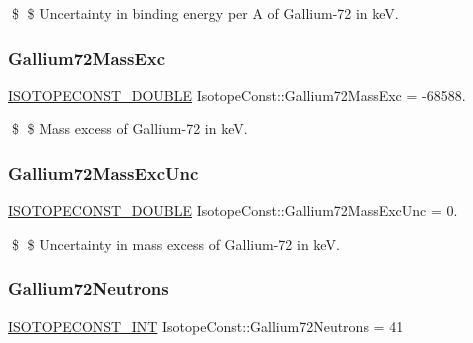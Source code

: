 \$ \$ Uncertainty in binding energy per A of Gallium-\/72 in keV. \mbox{\label{group___isotope_const-_gallium-_ga72_gac3fbf693140e57610e1c8f3db0bf1c1f}} 
\subsubsection{\texorpdfstring{Gallium72\+Mass\+Exc}{Gallium72MassExc}}
{\footnotesize\ttfamily \mbox{\hyperlink{group___isotope_const-_macros_ga8f45a7272ce02c0b4c65c44636ed719a}{I\+S\+O\+T\+O\+P\+E\+C\+O\+N\+S\+T\+\_\+\+D\+O\+U\+B\+LE}} Isotope\+Const\+::\+Gallium72\+Mass\+Exc = -\/68588.}

\$ \$ Mass excess of Gallium-\/72 in keV. \mbox{\label{group___isotope_const-_gallium-_ga72_ga4ed0a07a82e7fa015e0133e09f1fa473}} 
\subsubsection{\texorpdfstring{Gallium72\+Mass\+Exc\+Unc}{Gallium72MassExcUnc}}
{\footnotesize\ttfamily \mbox{\hyperlink{group___isotope_const-_macros_ga8f45a7272ce02c0b4c65c44636ed719a}{I\+S\+O\+T\+O\+P\+E\+C\+O\+N\+S\+T\+\_\+\+D\+O\+U\+B\+LE}} Isotope\+Const\+::\+Gallium72\+Mass\+Exc\+Unc = 0.}

\$ \$ Uncertainty in mass excess of Gallium-\/72 in keV. \mbox{\label{group___isotope_const-_gallium-_ga72_ga708b738f552738bd425ffd8454725b46}} 
\subsubsection{\texorpdfstring{Gallium72\+Neutrons}{Gallium72Neutrons}}
{\footnotesize\ttfamily \mbox{\hyperlink{group___isotope_const-_macros_ga5f18360b3e99483a35c32d789e62621c}{I\+S\+O\+T\+O\+P\+E\+C\+O\+N\+S\+T\+\_\+\+I\+NT}} Isotope\+Const\+::\+Gallium72\+Neutrons = 41}

